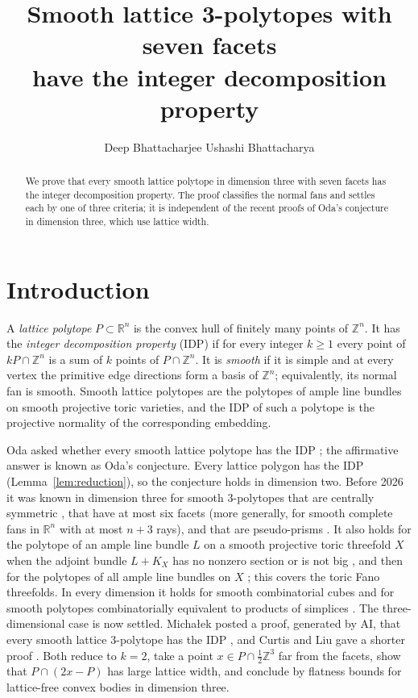 \documentclass[12pt]{article}
\title{Smooth lattice 3-polytopes with seven facets\\ have the integer decomposition property}
\author{Deep Bhattacharjee\authornote{1}
\qquad
Ushashi Bhattacharya\authornote{2}}
\newcommand{\R}{\mathbb{R}}
\newcommand{\Z}{\mathbb{Z}}
\begin{document}
\maketitle

\begin{abstract}
We prove that every smooth lattice polytope in dimension three with seven facets has the integer decomposition property. The proof classifies the normal fans and settles each by one of three criteria; it is independent of the recent proofs of Oda's conjecture in dimension three, which use lattice width.
\end{abstract}

\section{Introduction}

A \emph{lattice polytope} $P\subset\R^n$ is the convex hull of finitely many points of $\Z^n$. It has the \emph{integer decomposition property} (IDP) if for every integer $k\ge1$ every point of $kP\cap\Z^n$ is a sum of $k$ points of $P\cap\Z^n$. It is \emph{smooth} if it is simple and at every vertex the primitive edge directions form a basis of $\Z^n$; equivalently, its normal fan is smooth. Smooth lattice polytopes are the polytopes of ample line bundles on smooth projective toric varieties, and the IDP of such a polytope is the projective normality of the corresponding embedding.

Oda asked whether every smooth lattice polytope has the IDP \cite[Problems~2 and~3]{Oda08}; the affirmative answer is known as Oda's conjecture. Every lattice polygon has the IDP (Lemma~\ref{lem:reduction}), so the conjecture holds in dimension two. Before 2026 it was known in dimension three for smooth $3$-polytopes that are centrally symmetric \cite{BHH19}, that have at most six facets \cite{Rob24} (more generally, for smooth complete fans in $\R^n$ with at most $n+3$ rays), and that are pseudo-prisms \cite{Cur25}. It also holds for the polytope of an ample line bundle $L$ on a smooth projective toric threefold $X$ when the adjoint bundle $L+K_X$ has no nonzero section or is not big \cite{Oga12}, and then for the polytopes of all ample line bundles on $X$ \cite{Oga14}; this covers the toric Fano threefolds. In every dimension it holds for smooth combinatorial cubes \cite{Cur25} and for smooth polytopes combinatorially equivalent to products of simplices \cite{CLL26}. The three-dimensional case is now settled. Micha\l{}ek posted a proof, generated by AI, that every smooth lattice $3$-polytope has the IDP \cite{Mic26}, and Curtis and Liu gave a shorter proof \cite{CuLi26}. Both reduce to $k=2$, take a point $x\in P\cap\frac12\Z^3$ far from the facets, show that $P\cap(2x-P)$ has large lattice width, and conclude by flatness bounds for lattice-free convex bodies in dimension three.
\end{document}
